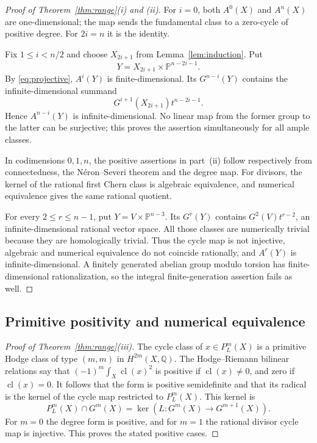 \documentclass[11pt]{article}
\newcommand{\cl}{\operatorname{cl}}
\newcommand{\Q}{\mathbb Q}
\newcommand{\PP}{\mathbb P}
\theoremstyle{definition}
\theoremstyle{remark}
\begin{document}
\begin{proof}[Proof of Theorem~\ref{thm:range}(i) and (ii)]
For $i=0$, both $A^0(X)$ and $A^n(X)$ are one-dimensional; the map sends the fundamental class to a zero-cycle of positive degree. For $2i=n$ it is the identity.

Fix $1\leq i<n/2$ and choose $X_{2i+1}$ from Lemma~\ref{lem:induction}. Put
\[
                 Y=X_{2i+1}\times\PP^{n-2i-1}.
\]
By \eqref{eq:projective}, $A^i(Y)$ is finite-dimensional. Its $G^{n-i}(Y)$ contains the infinite-dimensional summand
\[
            G^{i+1}(X_{2i+1})t^{n-2i-1}.
\]
Hence $A^{n-i}(Y)$ is infinite-dimensional. No linear map from the former group to the latter can be surjective; this proves the assertion simultaneously for all ample classes.

In codimensions $0,1,n$, the positive assertions in part~(ii) follow respectively from connectedness, the N\'eron--Severi theorem and the degree map. For divisors, the kernel of the rational first Chern class is algebraic equivalence, and numerical equivalence gives the same rational quotient.

For every $2\leq r\leq n-1$, put $Y=V\times\PP^{n-3}$. Its $G^r(Y)$ contains $G^2(V)t^{r-2}$, an infinite-dimensional rational vector space. All those classes are numerically trivial because they are homologically trivial. Thus the cycle map is not injective, algebraic and numerical equivalence do not coincide rationally, and $A^r(Y)$ is infinite-dimensional. A finitely generated abelian group modulo torsion has finite-dimensional rationalization, so the integral finite-generation assertion fails as well.
\end{proof}

\subsection{Primitive positivity and numerical equivalence}

\begin{proof}[Proof of Theorem~\ref{thm:range}(iii)]
The cycle class of $x\in P^m_L(X)$ is a primitive Hodge class of type $(m,m)$ in $H^{2m}(X,\Q)$. The Hodge--Riemann bilinear relations say that $(-1)^m\int_X\cl(x)^2$ is positive if $\cl(x)\ne0$, and zero if $\cl(x)=0$. It follows that the form is positive semidefinite and that its radical is the kernel of the cycle map restricted to $P^m_L(X)$. This kernel is
\[
 P^m_L(X)\cap G^m(X)=\ker(L:G^m(X)\to G^{m+1}(X)).
\]
For $m=0$ the degree form is positive, and for $m=1$ the rational divisor cycle map is injective. This proves the stated positive cases.
\end{proof}
\end{document}
